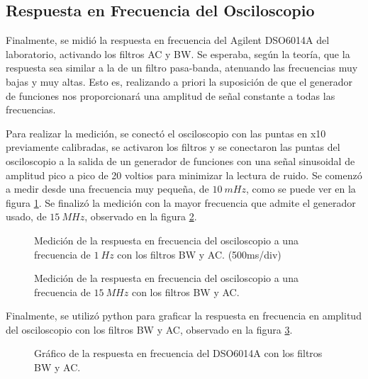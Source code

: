 \documentclass[a4paper]{article}
\begin{document}
\subsection*{Respuesta en Frecuencia del Osciloscopio}
Finalmente, se midió la respuesta en frecuencia del Agilent DSO6014A del laboratorio, activando los filtros AC y BW. Se esperaba, según la teoría, que la respuesta sea similar a la de un filtro pasa-banda, atenuando las frecuencias muy bajas y muy altas. Esto es, realizando a priori la suposición de que el generador de funciones nos proporcionará una amplitud de señal constante a todas las frecuencias.

Para realizar la medición, se conectó el osciloscopio con las puntas en x10 previamente calibradas, se activaron los filtros y se conectaron las puntas del osciloscopio a la salida de un generador de funciones con una señal sinusoidal de amplitud pico a pico de 20 voltios para minimizar la lectura de ruido. Se comenzó a medir desde una frecuencia muy pequeña, de $10 \ mHz$, como se puede ver en la figura \ref{graf:osci_freq_baja}. Se finalizó la medición con la mayor frecuencia que admite el generador usado, de $15 \ MHz$, observado en la figura \ref{graf:osci_freq_alta}.

\begin{figure}[H]
	\centering
	\caption{Medición de la respuesta en frecuencia del osciloscopio a una frecuencia de $1 \ Hz$ con los filtros BW y AC. (500ms/div)} 
	\label{graf:osci_freq_baja}
\end{figure}

\begin{figure}[H]
	\centering
	\caption{Medición de la respuesta en frecuencia del osciloscopio a una frecuencia de $15 \ MHz$ con los filtros BW y AC.} 
	\label{graf:osci_freq_alta}
\end{figure}


Finalmente, se utilizó python para graficar la respuesta en frecuencia en amplitud del osciloscopio con los filtros BW y AC, observado en la figura \ref{graf:resp_freq_osci}.

\begin{figure}[H]
	\centering
	\caption{Gráfico de la respuesta en frecuencia del DSO6014A con los filtros BW y AC.} 
	\label{graf:resp_freq_osci}
\end{figure}
\end{document}
